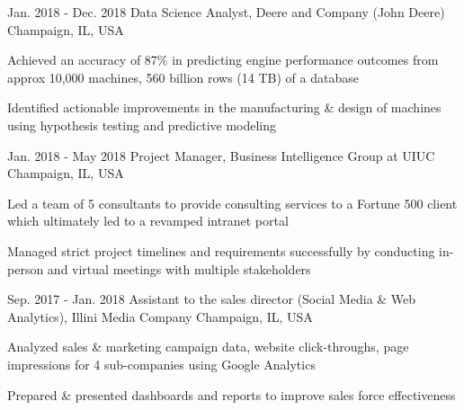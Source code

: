 \begin{cventries}
  \cventry
    {Jan. 2018 - Dec. 2018} %
    {Data Science Analyst, Deere and Company (John Deere)} %
    {Champaign, IL, USA} %
    {} %
    {
      \begin{cvitems} %
        \item {Achieved an accuracy of 87\% in predicting engine performance outcomes from approx 10,000 machines, 560 billion rows (14 TB) of a database}
        \item {Identified actionable improvements in the manufacturing \& design of machines using hypothesis testing and predictive modeling}
      \end{cvitems}
    }

  \cventry
    {Jan. 2018 - May 2018} %
    {Project Manager, Business Intelligence Group at UIUC} %
    {Champaign, IL, USA} %
    {} %
    {
      \begin{cvitems} %
        \item { Led a team of 5 consultants to provide consulting services to a Fortune 500 client which ultimately led to a revamped intranet portal}
        \item { Managed strict project timelines and requirements successfully by conducting in-person and virtual meetings with multiple stakeholders}
      \end{cvitems}
    }

  \cventry
    {Sep. 2017 - Jan. 2018} %
    {Assistant to the sales director (Social Media \& Web Analytics), Illini Media Company} %
    {Champaign, IL, USA} %
    {} %
    {
      \begin{cvitems} %
        \item {Analyzed sales \& marketing campaign data, website click-throughs, page impressions for 4 sub-companies using Google Analytics}
        \item {Prepared \& presented dashboards and reports to improve sales force effectiveness}
      \end{cvitems}
    }


\end{cventries}
